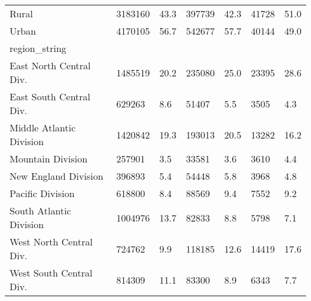 \begin{longtable}{lllllll}
\midrule
Rural & 3183160 & 43.3 & 397739 & 42.3 & 41728 & 51.0 \\ 
Urban & 4170105 & 56.7 & 542677 & 57.7 & 40144 & 49.0 \\ 
\midrule
\multicolumn{1}{l}{region\_string} \\ 
\midrule
East North Central Div. & 1485519 & 20.2 & 235080 & 25.0 & 23395 & 28.6 \\ 
East South Central Div. & 629263 & 8.6 & 51407 & 5.5 & 3505 & 4.3 \\ 
Middle Atlantic Division & 1420842 & 19.3 & 193013 & 20.5 & 13282 & 16.2 \\ 
Mountain Division & 257901 & 3.5 & 33581 & 3.6 & 3610 & 4.4 \\ 
New England Division & 396893 & 5.4 & 54448 & 5.8 & 3968 & 4.8 \\ 
Pacific Division & 618800 & 8.4 & 88569 & 9.4 & 7552 & 9.2 \\ 
South Atlantic Division & 1004976 & 13.7 & 82833 & 8.8 & 5798 & 7.1 \\ 
West North Central Div. & 724762 & 9.9 & 118185 & 12.6 & 14419 & 17.6 \\ 
West South Central Div. & 814309 & 11.1 & 83300 & 8.9 & 6343 & 7.7 \\ 
\bottomrule
\end{longtable}

